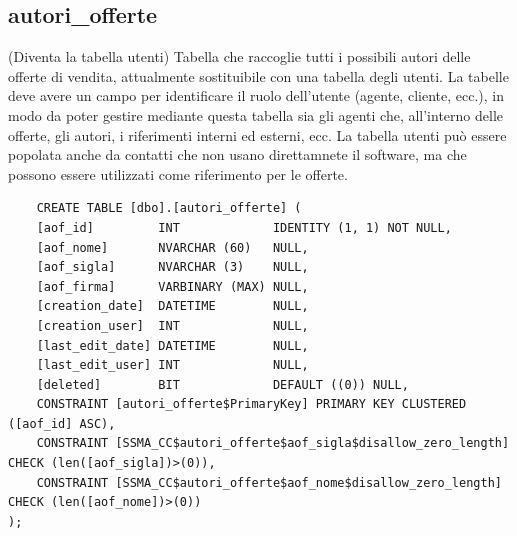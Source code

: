 \documentclass[12pt]{article}
\begin{document}
\subsection{autori\_offerte}(Diventa la tabella utenti)
Tabella che raccoglie tutti i possibili autori delle offerte di vendita, attualmente sostituibile con una tabella degli utenti.
La tabelle deve avere un campo per identificare il ruolo dell'utente (agente, cliente, ecc.),
in modo da poter gestire mediante questa tabella sia gli agenti che, all'interno delle offerte, gli autori, i riferimenti interni ed esterni, ecc.
La tabella utenti può essere popolata anche da contatti che non usano direttamnete il software, ma che possono essere utilizzati come riferimento per le offerte.
\begin{lstlisting}
    CREATE TABLE [dbo].[autori_offerte] (
    [aof_id]         INT             IDENTITY (1, 1) NOT NULL,
    [aof_nome]       NVARCHAR (60)   NULL,
    [aof_sigla]      NVARCHAR (3)    NULL,
    [aof_firma]      VARBINARY (MAX) NULL,
    [creation_date]  DATETIME        NULL,
    [creation_user]  INT             NULL,
    [last_edit_date] DATETIME        NULL,
    [last_edit_user] INT             NULL,
    [deleted]        BIT             DEFAULT ((0)) NULL,
    CONSTRAINT [autori_offerte$PrimaryKey] PRIMARY KEY CLUSTERED ([aof_id] ASC),
    CONSTRAINT [SSMA_CC$autori_offerte$aof_sigla$disallow_zero_length] CHECK (len([aof_sigla])>(0)),
    CONSTRAINT [SSMA_CC$autori_offerte$aof_nome$disallow_zero_length] CHECK (len([aof_nome])>(0))
);
\end{lstlisting}
\end{document}
